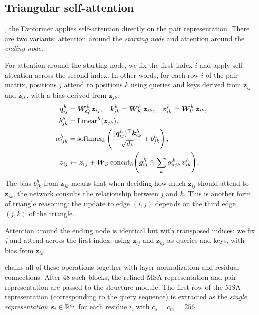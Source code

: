 \subsection*{Triangular self-attention}
\label{sec:af2-tri-attn}

, the Evoformer applies self-attention directly on the pair representation.
There are two variants: attention around the \emph{starting node} and attention around the \emph{ending node}.

For attention around the starting node, we fix the first index $i$ and apply self-attention across the second index.
In other words, for each row $i$ of the pair matrix, positions $j$ attend to positions $k$ using queries and keys derived from $\bm{z}_{ij}$ and $\bm{z}_{ik}$, with a bias derived from $\bm{z}_{jk}$:
\begin{align}
\bm{q}_{ij}^h &= \bm{W}_Q^h\, \bm{z}_{ij}, \quad
\bm{k}_{ik}^h = \bm{W}_K^h\, \bm{z}_{ik}, \quad
\bm{v}_{ik}^h = \bm{W}_V^h\, \bm{z}_{ik}, \label{eq:tri-attn-start-qkv} \\
b_{jk}^h &= \text{Linear}^h(\bm{z}_{jk}), \label{eq:tri-attn-start-bias} \\
\alpha_{ijk}^h &= \operatorname{softmax}_k \left( \frac{(\bm{q}_{ij}^h)^\top \bm{k}_{ik}^h}{\sqrt{d_k}} + b_{jk}^h \right), \label{eq:tri-attn-start-weights} \\
\bm{z}_{ij} &\leftarrow \bm{z}_{ij} + \bm{W}_O \, \text{concat}_h \!\left(\bm{g}_{ij}^h \odot \sum_k \alpha_{ijk}^h\, \bm{v}_{ik}^h\right). \label{eq:tri-attn-start-out}
\end{align}
The bias $b_{jk}^h$ from $\bm{z}_{jk}$ means that when deciding how much $\bm{z}_{ij}$ should attend to $\bm{z}_{ik}$, the network consults the relationship between $j$ and $k$.
This is another form of triangle reasoning: the update to edge $(i,j)$ depends on the third edge $(j,k)$ of the triangle.

Attention around the ending node is identical but with transposed indices: we fix $j$ and attend across the first index, using $\bm{z}_{ij}$ and $\bm{z}_{kj}$ as queries and keys, with bias from $\bm{z}_{ik}$.

 chains all of these operations together with layer normalization and residual connections.
After 48 such blocks, the refined MSA representation and pair representation are passed to the structure module.
The first row of the MSA representation (corresponding to the query sequence) is extracted as the \emph{single representation} $\bm{s}_i \in \mathbb{R}^{c_s}$ for each residue $i$, with $c_s = c_m = 256$.


